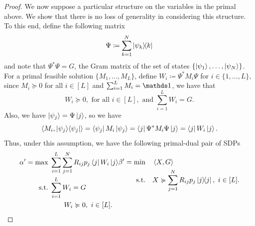 \begin{proof}
We now suppose a particular structure on the variables in the primal above. 
We show that there is no loss of generality in considering this structure. 
To this end, define the following matrix 
\begin{equation}
    \Psi \coloneqq \sum\limits_{k=1}^N \ketbra{\psi_k}{k} 
\end{equation} 
and note that $\Psi^*\Psi = G$, the Gram matrix of the set of states $\{ \ket{\psi_1}, \ldots, \ket{\psi_N} \}$. 
For a primal feasible solution $\{M_1, \dots, M_L\}$, define $W_i \coloneqq \Psi^* M_i \Psi$ for $i \in \{1, \dots, L\}$, since $M_i \succcurlyeq 0$ for all $i \in [L]$ and $\sum_{i=1}^L M_i = \id$, we have that 
\begin{equation} 
    W_i \succcurlyeq 0, \text{ for all } i \in [L], \text{ and } \sum_{i=1}^L W_i = G. 
\end{equation}
Also, we have $\ket{\psi_j} = \Psi \ket{j}$, so we have
\begin{equation}\label{eq:ch3_QSD-M_W}
    \left\langle M_i, | \psi_j \rangle \langle \psi_j | \right\rangle 
    = \bra{\psi_j} {M_i} \ket{\psi_j} 
    = \bra{j} \Psi^* {M_i} \Psi \ket{j} 
    = \bra{j} W_i \ket{j}. 
\end{equation}
Thus, under this assumption, we have the following primal-dual pair of SDPs
\begin{equation}
\label{prog:ch3_QSD-P'_D'}
        \begin{aligned}
            \alpha' = \max \; & \sum_{i=1}^L \sum_{j=1}^N R_{ij} p_j \bra{j} W_i \ket{j} \\
            \textrm{s.t.} \; & \sum_{i=1}^L W_i = G \\
            & \hspace{20pt} W_i \succcurlyeq 0,\ i \in [L]. \\ 
        \end{aligned}
        \begin{aligned}
            \beta' = \min \quad & \left\langle X, G \right\rangle \\
            \textrm{s.t.} \quad & X \succcurlyeq \sum_{j=1}^N R_{ij} p_j \ketbra{j},\ i \in [L]. \\
            & \phantom{N}
        \end{aligned}
\end{equation} 


\end{proof}
